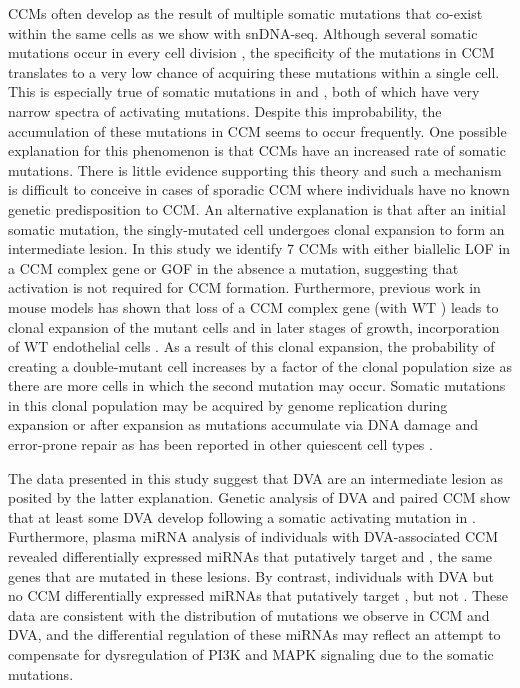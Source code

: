 CCMs often develop as the result of multiple somatic mutations that co-exist within the same cells as we show with snDNA-seq. Although several somatic mutations occur in every cell division \citep{rodin2021}, the specificity of the mutations in CCM translates to a very low chance of acquiring these mutations within a single cell. This is especially true of somatic mutations in  and , both of which have very narrow spectra of activating mutations. Despite this improbability, the accumulation of these mutations in CCM seems to occur frequently. One possible explanation for this phenomenon is that CCMs have an increased rate of somatic mutations. There is little evidence supporting this theory and such a mechanism is difficult to conceive in cases of sporadic CCM where individuals have no known genetic predisposition to CCM. An alternative explanation is that after an initial somatic mutation, the singly-mutated cell undergoes clonal expansion to form an intermediate lesion. In this study we identify 7 CCMs with either biallelic LOF in a CCM complex gene or  GOF in the absence a  mutation, suggesting that  activation is not required for CCM formation. Furthermore, previous work in mouse models has shown that loss of a CCM complex gene (with WT ) leads to clonal expansion of the mutant cells and in later stages of growth, incorporation of WT endothelial cells \citep{detter2018, malinverno2019}. As a result of this clonal expansion, the probability of creating a double-mutant cell increases by a factor of the clonal population size as there are more cells in which the second mutation may occur. Somatic mutations in this clonal population may be acquired by genome replication during expansion or after expansion as mutations accumulate via DNA damage and error-prone repair as has been reported in other quiescent cell types \citep{lodato2018}. 

The data presented in this study suggest that DVA are an intermediate lesion as posited by the latter explanation. Genetic analysis of DVA and paired CCM show that at least some DVA develop following a somatic activating mutation in . Furthermore, plasma miRNA analysis of individuals with DVA-associated CCM revealed differentially expressed miRNAs that putatively target  and , the same genes that are mutated in these lesions. By contrast, individuals with DVA but no CCM differentially expressed miRNAs that putatively target , but not . These data are consistent with the distribution of mutations we observe in CCM and DVA, and the differential regulation of these miRNAs may reflect an attempt to compensate for dysregulation of PI3K and MAPK signaling due to the somatic mutations. 

